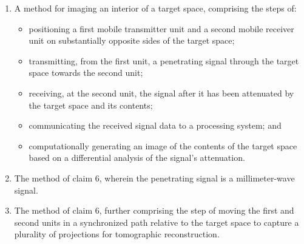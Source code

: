 \documentclass[11pt,letterpaper]{article}
\begin{document}
\begin{enumerate}[label=\textbf{\arabic*.}, leftmargin=0.5in, itemsep=0.4cm]
    \item A method for imaging an interior of a target space, comprising the steps of:
    \begin{itemize}[leftmargin=0.3in, noitemsep]
        \item positioning a first mobile transmitter unit and a second mobile receiver unit on substantially opposite sides of the target space;
        \item transmitting, from the first unit, a penetrating signal through the target space towards the second unit;
        \item receiving, at the second unit, the signal after it has been attenuated by the target space and its contents;
        \item communicating the received signal data to a processing system; and
        \item computationally generating an image of the contents of the target space based on a differential analysis of the signal's attenuation.
    \end{itemize}

    \item The method of claim 6, wherein the penetrating signal is a millimeter-wave signal.

    \item The method of claim 6, further comprising the step of moving the first and second units in a synchronized path relative to the target space to capture a plurality of projections for tomographic reconstruction.
\end{enumerate}
\end{document}
